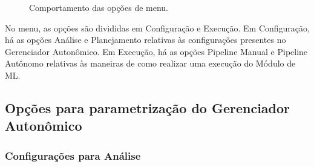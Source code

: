 \documentclass[Portugues,Final]{ic-tese-v3}
\begin{document}
\begin{figure}[H]
    \centering
    \caption{Comportamento das opções de menu.}
    \label{fig:opcoesMenu}
\end{figure}

No menu, as opções são divididas em Configuração e Execução. Em Configuração, há as opções Análise e Planejamento relativas às configurações presentes no Gerenciador Autonômico. Em Execução, há as opções Pipeline Manual e Pipeline Autônomo relativas às maneiras de como realizar uma execução do Módulo de ML.

\subsection{Opções para parametrização do Gerenciador Autonômico}

\subsubsection{Configurações para Análise}
\end{document}
